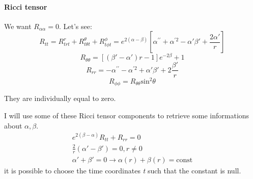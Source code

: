 \paragraph{Ricci tensor}
We want $R_{\alpha \alpha } = 0$. Let's see:
\begin{equation}
	R_{tt} = R^{r}_{trt} + R^{\theta }_{t\theta t} + R^{\phi }_{t\phi t} = e^{2\left( \alpha -\beta  \right)}\left[ \alpha^{\prime \prime } + \alpha ^{\prime 2} - \alpha '\beta ' +\frac{2\alpha '}{r}\right] 
\end{equation}
\begin{equation}
	R_{\theta \theta } = \left[ \left( \beta ' - \alpha '  \right)r-1\right] e^{-2\beta }+1
\end{equation}
\begin{equation}
R_{rr} = -\alpha^{\prime \prime } - \alpha ^{\prime 2} + \alpha ' \beta ' + 2 \frac{\beta '}{r}
\end{equation}
\begin{equation}
	R_{\phi \phi } = R_{\theta \theta }\text{sin}^{2}\theta 
\end{equation}

They are individually equal to zero.

I will use some of these Ricci tensor components to retrieve some informations about $\alpha, \beta $.
\begin{gather*}
e^{2\left( \beta -\alpha  \right)}R_{tt} + R_{rr} = 0 \\
\frac{2}{r}\left( \alpha '-\beta ' \right) = 0 , r\neq 0 \\
\alpha '+ \beta ' = 0 \to  \alpha \left( r \right)+\beta \left( r \right) = \text{const}
\end{gather*}
it is possible to choose the time coordinates \emph{t} such that the constant is null.

